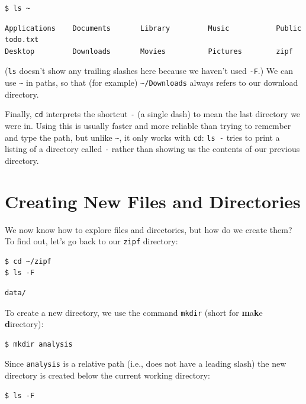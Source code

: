 \documentclass[
]{krantz}
\begin{document}
\begin{verbatim}
$ ls ~
\end{verbatim}

\begin{verbatim}
Applications    Documents       Library         Music           Public          todo.txt
Desktop         Downloads       Movies          Pictures        zipf
\end{verbatim}

(\texttt{ls} doesn't show any trailing slashes here because we haven't used \texttt{-F}.)
We can use \texttt{\textasciitilde{}} in paths,
so that (for example) \texttt{\textasciitilde{}/Downloads} always refers to our download directory.

Finally,
\texttt{cd} interprets the shortcut \texttt{-} (a single dash) to mean the last directory we were in.
Using this is usually faster and more reliable than trying to remember and type the path,
but unlike \texttt{\textasciitilde{}},
it only works with \texttt{cd}:
\texttt{ls~-} tries to print a listing of a directory called \texttt{-}
rather than showing us the contents of our previous directory.

\hypertarget{bash-basics-filedir}{%
\section{Creating New Files and Directories}\label{bash-basics-filedir}}

We now know how to explore files and directories,
but how do we create them?
To find out,
let's go back to our \texttt{zipf} directory:

\begin{verbatim}
$ cd ~/zipf
$ ls -F
\end{verbatim}

\begin{verbatim}
data/
\end{verbatim}

To create a new directory,
we use the command \texttt{mkdir} (short for \textbf{m}a\textbf{k}e \textbf{d}irectory):

\begin{verbatim}
$ mkdir analysis
\end{verbatim}

Since \texttt{analysis} is a relative path
(i.e., does not have a leading slash)
the new directory is created below the current working directory:

\begin{verbatim}
$ ls -F
\end{verbatim}
\end{document}
